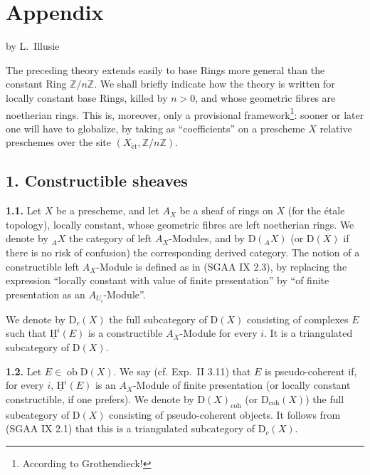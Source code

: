 \documentclass[11pt]{article}
\providecommand{\uH}{\underline{\mathrm H}}
\newcommand{\D}{\mathrm{D}}
\newcommand{\Z}{\mathbb{Z}}
\newcommand{\ob}{\operatorname{ob}}
\providecommand{\ob}{\operatorname{ob}}
\providecommand{\Z}{\mathbb Z}
\begin{document}
\section*{Appendix}
\begin{center}
by L.~Illusie
\end{center}

The preceding theory extends easily to base Rings more general than the constant Ring $\Z/n\Z$. We shall briefly indicate how the theory is written for locally constant base Rings, killed by $n>0$, and whose geometric fibres are noetherian rings. This is, moreover, only a provisional framework\footnote{According to Grothendieck!}: sooner or later one will have to globalize, by taking as ``coefficients'' on a prescheme $X$ relative preschemes over the site $(X_{\mathrm{\acute et}},\Z/n\Z)$.

\subsection*{1. Constructible sheaves}

\textbf{1.1.} Let $X$ be a prescheme, and let $A_X$ be a sheaf of rings on $X$ (for the étale topology), locally constant, whose geometric fibres are left noetherian rings. We denote by ${}_A X$ the category of left $A_X$-Modules, and by $\D({}_A X)$ (or $\D(X)$ if there is no risk of confusion) the corresponding derived category. The notion of a constructible left $A_X$-Module is defined as in (SGAA IX 2.3), by replacing the expression ``locally constant with value of finite presentation'' by ``of finite presentation as an $A_{U_i}$-Module''.

We denote by $\D_c(X)$ the full subcategory of $\D(X)$ consisting of complexes $E$ such that $\uH^i(E)$ is a constructible $A_X$-Module for every $i$. It is a triangulated subcategory of $\D(X)$.

\textbf{1.2.} Let $E\in\ob\D(X)$. We say (cf. Exp.~II 3.11) that $E$ is pseudo-coherent if, for every $i$, $\uH^i(E)$ is an $A_X$-Module of finite presentation (or locally constant constructible, if one prefers). We denote by $\D(X)_{\mathrm{coh}}$ (or $\D_{\mathrm{coh}}(X)$) the full subcategory of $\D(X)$ consisting of pseudo-coherent objects. It follows from (SGAA IX 2.1) that this is a triangulated subcategory of $\D_c(X)$.
\end{document}
